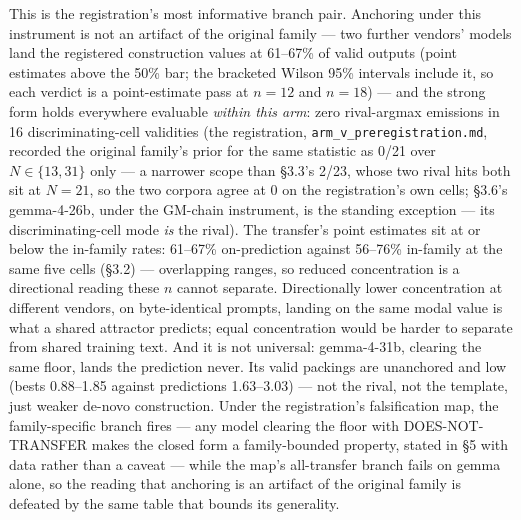This is the registration's most informative branch pair. Anchoring under this instrument
is not an artifact of the original family --- two further vendors' models land the
registered construction values at 61--67\% of valid outputs (point estimates above the
50\% bar; the bracketed Wilson 95\% intervals include it, so each verdict is a
point-estimate pass at $n = 12$ and $n = 18$) --- and the strong form holds
everywhere evaluable \emph{within this arm}: zero rival-argmax emissions in 16
discriminating-cell validities (the registration, \texttt{arm\_v\_preregistration.md}, recorded the original family's prior for
the same statistic as 0/21 over $N \in \{13, 31\}$ only --- a narrower scope than \S3.3's 2/23, whose two rival hits both sit at $N = 21$, so the two corpora agree at 0 on the registration's own cells; \S3.6's gemma-4-26b, under the GM-chain instrument, is the
standing exception --- its discriminating-cell mode \emph{is} the rival). The transfer's point estimates sit at or below
the in-family rates: 61--67\% on-prediction against 56--76\% in-family at the same five cells (\S3.2) --- overlapping
ranges, so reduced concentration is a directional reading these $n$ cannot separate. Directionally lower concentration at
different vendors, on byte-identical prompts, landing on the same modal value is what a shared
attractor predicts; equal concentration would be harder to separate from shared training text. And it is not universal:
gemma-4-31b, clearing the same floor, lands the prediction never. Its valid packings are unanchored and low
(bests 0.88--1.85 against predictions 1.63--3.03) --- not the rival, not the template, just
weaker de-novo construction. Under the registration's falsification map, the family-specific branch fires --- any model
clearing the floor with DOES-NOT-TRANSFER makes the closed form a family-bounded property, stated
in \S5 with data rather than a caveat --- while the map's all-transfer branch fails on gemma
alone, so the reading that anchoring is an artifact of the original family is defeated by
the same table that bounds its generality.

